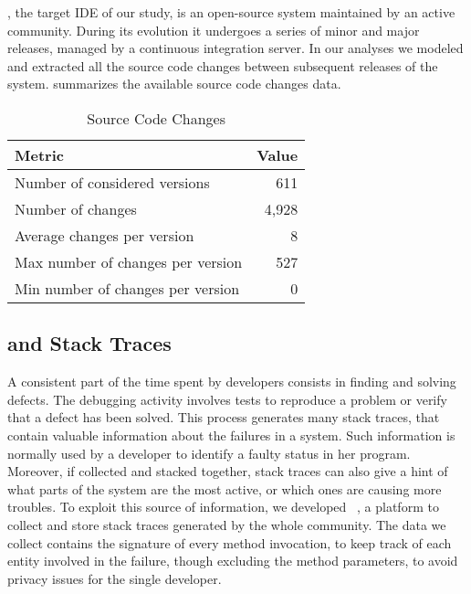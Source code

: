 \pha, the target IDE of our study, is an open-source system maintained by an active community.
During its evolution it undergoes a series of minor and major releases, managed by a continuous integration server.
In our analyses we modeled and extracted all the source code changes between subsequent releases of the system.
 summarizes the available source code changes data.

\begin{table}[ht]
\caption{Source Code Changes}
\label{tab:pharo}
\begin{tabularx}{\linewidth}{X|r}


\rowcolor{gray!30} \textbf{Metric} & \textbf{Value} \\ \hline
Number of considered versions & 611 \\
Number of changes & 4,928 \\
Average changes per version & 8 \\
Max number of changes per version & 527 \\
Min number of changes per version & 0 \\
\end{tabularx}
\end{table}



\subsection{\sli and Stack Traces}\label{sub:stacktraces}

A consistent part of the time spent by developers consists in finding and solving defects.
The debugging activity involves tests to reproduce a problem or verify that a defect has been solved.
This process generates many stack traces, that contain valuable information about the failures in a system.
Such information is normally used by a developer to identify a faulty status in her program.
Moreover, if collected and stacked together, stack traces can also give a hint of what parts of the system are the most active, or which ones are causing more troubles.
To exploit this source of information, we developed \sli~\cite{DalS2015a}, a platform to collect and store stack traces generated by the whole \pha community.
The data we collect contains the signature of every method invocation, to keep track of each entity involved in the failure, though excluding the method parameters, to avoid privacy issues for the single developer.

